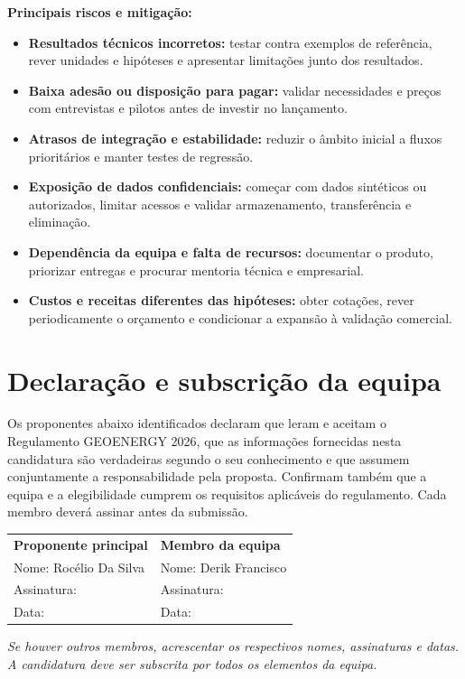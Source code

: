 \documentclass[11pt,a4paper]{article}
\begin{document}
\vspace{0.5em}
\textbf{Principais riscos e mitigação:}
\begin{itemize}
  \item \textbf{Resultados técnicos incorretos:} testar contra exemplos de referência,
  rever unidades e hipóteses e apresentar limitações junto dos resultados.
  \item \textbf{Baixa adesão ou disposição para pagar:} validar necessidades e preços
  com entrevistas e pilotos antes de investir no lançamento.
  \item \textbf{Atrasos de integração e estabilidade:} reduzir o âmbito inicial a
  fluxos prioritários e manter testes de regressão.
  \item \textbf{Exposição de dados confidenciais:} começar com dados sintéticos ou
  autorizados, limitar acessos e validar armazenamento, transferência e eliminação.
  \item \textbf{Dependência da equipa e falta de recursos:} documentar o produto,
  priorizar entregas e procurar mentoria técnica e empresarial.
  \item \textbf{Custos e receitas diferentes das hipóteses:} obter cotações, rever
  periodicamente o orçamento e condicionar a expansão à validação comercial.
\end{itemize}

\section*{Declaração e subscrição da equipa}

Os proponentes abaixo identificados declaram que leram e aceitam o Regulamento
GEOENERGY 2026, que as informações fornecidas nesta candidatura são verdadeiras
segundo o seu conhecimento e que assumem conjuntamente a responsabilidade pela
proposta. Confirmam também que a equipa e a elegibilidade cumprem os requisitos
aplicáveis do regulamento. Cada membro deverá assinar antes da submissão.

\vspace{1em}
\begin{tabularx}{\textwidth}{X X}
  \textbf{Proponente principal} & \textbf{Membro da equipa} \\
  Nome: Rocélio Da Silva & Nome: Derik Francisco \\
  Assinatura: \hrulefill & Assinatura: \hrulefill \\
  Data: \hrulefill & Data: \hrulefill \\
\end{tabularx}

\vspace{1em}
\textit{Se houver outros membros, acrescentar os respectivos nomes, assinaturas e
datas. A candidatura deve ser subscrita por todos os elementos da equipa.}
\end{document}
